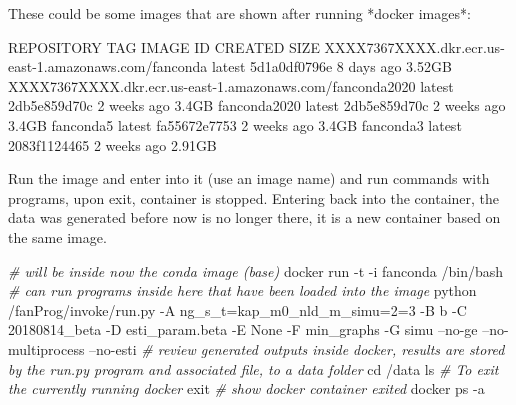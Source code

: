 \documentclass[
]{book}
\newenvironment{Shaded}{\begin{snugshade}}{\end{snugshade}}
\newcommand{\BuiltInTok}[1]{#1}
\newcommand{\CommentTok}[1]{\textcolor[rgb]{0.56,0.35,0.01}{\textit{#1}}}
\newcommand{\ExtensionTok}[1]{#1}
\newcommand{\FunctionTok}[1]{\textcolor[rgb]{0.00,0.00,0.00}{#1}}
\newcommand{\NormalTok}[1]{#1}
\begin{document}
\begin{Shaded}
\begin{Highlighting}[]
\ExtensionTok{These}\NormalTok{ could be some images that are shown after running *docker images*:}

\ExtensionTok{REPOSITORY}\NormalTok{                                                     TAG                 IMAGE ID            CREATED             SIZE}
\ExtensionTok{XXXX7367XXXX.dkr.ecr.us-east-1.amazonaws.com/fanconda}\NormalTok{       latest              5d1a0df0796e        8 days ago          3.52GB}
\ExtensionTok{XXXX7367XXXX.dkr.ecr.us-east-1.amazonaws.com/fanconda2020}\NormalTok{   latest              2db5e859d70c        2 weeks ago         3.4GB}
\ExtensionTok{fanconda2020}\NormalTok{                                                latest              2db5e859d70c        2 weeks ago         3.4GB}
\ExtensionTok{fanconda5}\NormalTok{                                                   latest              fa55672e7753        2 weeks ago         3.4GB}
\ExtensionTok{fanconda3}\NormalTok{                                                   latest              2083f1124465        2 weeks ago         2.91GB}
\end{Highlighting}
\end{Shaded}

Run the image and enter into it (use an image name) and run commands with programs, upon exit, container is stopped. Entering back into the container, the data was generated before now is no longer there, it is a new container based on the same image.

\begin{Shaded}
\begin{Highlighting}[]
\CommentTok{# will be inside now the conda image (base)}
\ExtensionTok{docker}\NormalTok{ run -t -i fanconda /bin/bash}
\CommentTok{# can run programs inside here that have been loaded into the image}
\ExtensionTok{python}\NormalTok{ /fanProg/invoke/run.py -A ng_s_t=kap_m0_nld_m_simu=2=3 -B b -C 20180814_beta -D esti_param.beta -E None -F min_graphs -G simu --no-ge --no-multiprocess --no-esti}
\CommentTok{# review generated outputs inside docker, results are stored by the run.py program and associated file, to a data folder}
\BuiltInTok{cd}\NormalTok{ /data}
\FunctionTok{ls}
\CommentTok{# To exit the currently running docker}
\BuiltInTok{exit}
\CommentTok{# show docker container exited}
\ExtensionTok{docker}\NormalTok{ ps -a}
\end{Highlighting}
\end{Shaded}
\end{document}
